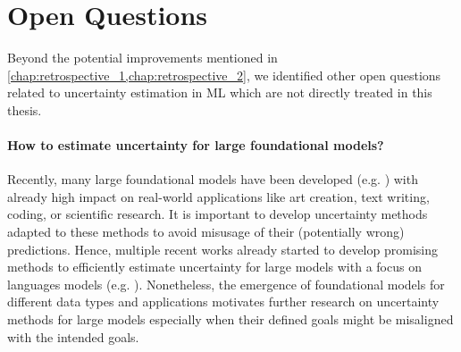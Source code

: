 


\section{Open Questions}

Beyond the potential improvements mentioned in \cref{chap:retrospective_1,chap:retrospective_2}, we identified other open questions related to uncertainty estimation in ML which are not directly treated in this thesis.

\paragraph{How to estimate uncertainty for large foundational models?} Recently, many large foundational models have been developed (e.g. \cite{gpt, rombach2021highresolution, galactica}) with already high impact on real-world applications like art creation, text writing, coding, or scientific research. It is important to develop uncertainty methods adapted to these methods to avoid misusage of their (potentially wrong) predictions. Hence, multiple recent works already started to develop promising methods to efficiently estimate uncertainty for large models with a focus on languages models (e.g. \citep{kuhn2023semantic,kadavath2022language}). Nonetheless, the emergence of foundational models for different data types and applications motivates further research on uncertainty methods for large models especially when their defined goals might be misaligned with the intended goals.


